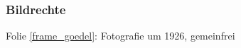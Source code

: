 \documentclass[onlymath]{beamer}
\begin{document}
\begin{frame}[t]\frametitle{Bildrechte}

Folie \ref{frame_goedel}: Fotografie um 1926, gemeinfrei

\end{frame}
\end{document}
